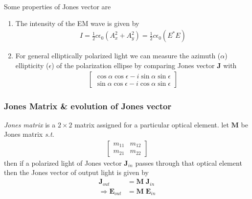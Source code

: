 \documentclass[11pt,a4paper]{article}
\numberwithin{equation}{section}
\begin{document}
Some properties of Jones vector are
\begin{enumerate}
	\item The intensity of the EM wave is given by 
	\begin{align}
		I= \frac{1}{2}c\epsilon_0(A_x^2+A_y^2) = \frac{1}{2}c\epsilon_0 (E^\ast E)
	\end{align}
	\item For general elliptically polarized light we can measure the azimuth ($\alpha$) ellipticity ($\epsilon$) of the polarization ellipse by comparing Jones vector $\textbf{J}$ with \cite{WO}
	\begin{align*}
		\begin{bmatrix}
			\cos\alpha\cos\epsilon- i \sin\alpha\sin\epsilon \\
			\sin\alpha\cos\epsilon- i \cos\alpha\sin\epsilon
		\end{bmatrix}
	\end{align*}
\end{enumerate}

\subsubsection{Jones Matrix \& evolution of Jones vector}
\textit{Jones matrix} is a $2\times2$ matrix assigned for a particular optical element. let $\textbf{M}$ be Jones matrix \textit{s.t.} 
\begin{align*}
	\begin{bmatrix}
		m_{11} & m_{12}\\
		m_{21} & m_{22}
	\end{bmatrix}
\end{align*}
then if a polarized light of Jones vector $\textbf{J}_{in}$ passes through that optical element then the Jones vector of output light is given by 
\begin{align}
	\textbf{J}_{out}&=\textbf{M}\;\textbf{J}_{in}\\
	\Rightarrow \textbf{E}_{out}&=\textbf{M}\;\textbf{E}_{in} \label{eq:1.5}
\end{align}
\end{document}

